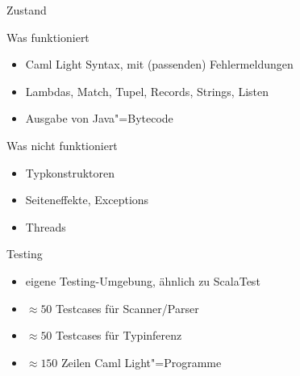 \documentclass[hyperref={pdfpagelabels=false}]{beamer}
\begin{document}
\begin{frame}{Zustand}
  \begin{exampleblock}{Was funktioniert}
    \begin{itemize}
      \item Caml Light Syntax, mit (passenden) Fehlermeldungen
      \item Lambdas, Match, Tupel, Records, Strings, Listen
      \item Ausgabe von Java"=Bytecode
    \end{itemize}
  \end{exampleblock}
  \begin{alertblock}{Was nicht funktioniert}
    \begin{itemize}
      \item Typkonstruktoren
      \item Seiteneffekte, Exceptions
      \item Threads
    \end{itemize}
  \end{alertblock}
\end{frame}

\begin{frame}{Testing}
  \begin{itemize}
    \item eigene Testing-Umgebung, ähnlich zu ScalaTest
    \item $\approx 50$ Testcases für Scanner/Parser
    \item $\approx 50$ Testcases für Typinferenz
    \item $\approx 150$ Zeilen Caml Light"=Programme
  \end{itemize}
\end{frame}
\end{document}
